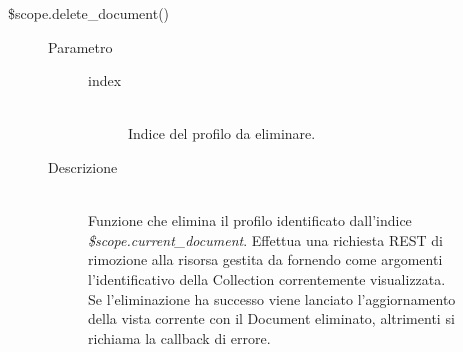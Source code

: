 \begin{description}
\begin{description}
\begin{description}
    \end{description}
 
  
  \item[\$scope.delete\_document()] \hfill
  \begin{description}
  	\item[Parametro] \hfill
  		\begin{description}
  			\item[index] \hfill \\
  			Indice del profilo da eliminare.
       \end{description}
  	\item[Descrizione] \hfill \\
   Funzione che elimina il profilo identificato dall'indice \textit{\$scope.current\_document}. Effettua una richiesta REST di rimozione alla risorsa gestita da  fornendo come argomenti l'identificativo della Collection correntemente visualizzata. \\
  Se l'eliminazione ha successo viene lanciato l'aggiornamento della vista corrente con il Document eliminato, altrimenti si richiama la callback di errore.
    \end{description}
 
 \end{description}
\end{description}

